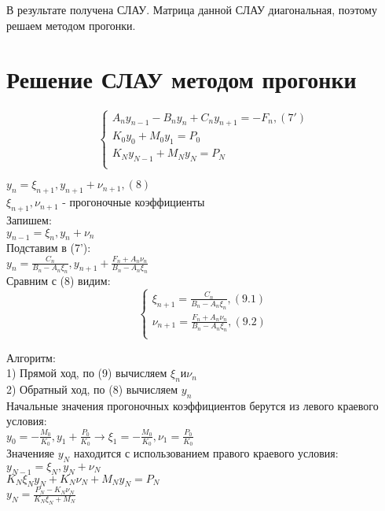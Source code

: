 В результате получена СЛАУ. Матрица данной СЛАУ диагональная, поэтому решаем методом прогонки.

\section{Решение СЛАУ методом прогонки}
\begin{equation}
\begin{cases}
A_{n} y_{n-1} - B_{n}y_{n} + C_{n}y_{n+1} = -F_{n}, (7')\\
K_{0} y_{0} + M_{0} y_{1} = P_{0}\\
K_{N} y_{N - 1} + M_{N} y_{N} = P_{N}\\
\end{cases}
\end{equation}

$y_{n} = \xi_{n+1}, y_{n+1} + \nu_{n+1}, (8)$\\
$\xi_{n+1}, \nu_{n+1}$ - прогоночные коэффициенты\\
Запишем:\\
$y_{n-1} = \xi_{n}, y_{n} + \nu_{n}$\\
Подставим в (7'):\\
$y_{n} = \frac{C_{n}}{B_{n} - A_{n}\xi_{n}}, y_{n+1} + \frac{F_{n} + A_{n} \nu_{n}}{B_{n} - A_{n} \xi_{n}}$\\
Сравним с (8) видим:\\
\begin{equation}
\begin{cases}
\xi_{n+1} = \frac{C_{n}}{B_{n} - A_{n} \xi_{n}}, (9.1)\\
\nu_{n+1} = \frac{F_{n} + A_{n} \nu_{n}}{B_{n} - A_{n} \xi_{n}}, (9.2)\\
\end{cases}
\end{equation}

Алгоритм:\\
1) Прямой ход, по (9) вычисляем $\xi_{n} и \nu_{n}$\\
2) Обратный ход, по (8) вычисляем $y_{n}$\\

Начальные значения прогоночных коэффициентов берутся из левого краевого условия:\\
$y_{0} = -\frac{M_{0}}{K_{0}}, y_{1} + \frac{P_{0}}{K_{0}} \rightarrow \xi_{1} = -\frac{M_{0}}{K_{0}}, \nu_{1} = \frac{P_{0}}{K_{0}}$\\

Значенияе $y_{N}$ находится с использованием правого краевого условия:\\
$y_{N - 1}  = \xi_{N}, y_{N} + \nu_{N}$\\
$K_{N} \xi_{N} y_{N} + K_{N} \nu_{N} + M_{N} y_{N} = P_{N}$\\
$y_{N} = \frac{P_{N} - K_{N} \nu_{N}}{K_{N} \xi_{N} + M_{N}}$\\


